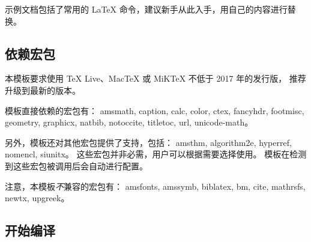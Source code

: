 \documentclass[a4paper]{ltxdoc}
\DeclareRobustCommand\pkg{\textsf}
\begin{document}
示例文档包括了常用的 \LaTeX{} 命令，建议新手从此入手，用自己的内容进行替换。


\subsection{依赖宏包}

本模板要求使用 TeX Live、MacTeX 或 MiKTeX 不低于 2017 年的发行版，
推荐升级到最新的版本。

模板直接依赖的宏包有：
\pkg{amsmath},
\pkg{caption},
\pkg{calc},
\pkg{color},
\pkg{ctex},
\pkg{fancyhdr},
\pkg{footmisc},
\pkg{geometry},
\pkg{graphicx},
\pkg{natbib},
\pkg{notoccite},
\pkg{titletoc},
\pkg{url},
\pkg{unicode-math}。

另外，模板还对其他宏包提供了支持，包括：
\pkg{amsthm},
\pkg{algorithm2e},
\pkg{hyperref},
\pkg{nomencl},
\pkg{siunitx}。
这些宏包并非必需，用户可以根据需要选择使用。
模板在检测到这些宏包被调用后会自动进行配置。

注意，本模板\emph{不}兼容的宏包有：
\pkg{amsfonts},
\pkg{amssymb},
\pkg{biblatex},
\pkg{bm},
\pkg{cite},
\pkg{mathrsfs},
\pkg{newtx},
\pkg{upgreek}。


\subsection{开始编译}
\end{document}

